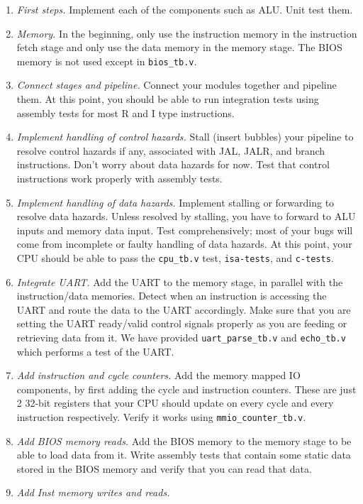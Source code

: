 \begin{enumerate}
\item \textit{First steps.}
  Implement each of the components such as ALU.
  Unit test them.
\item \textit{Memory.}
  In the beginning, only use the instruction memory in the instruction fetch stage and only use the data memory in the memory stage.
  The BIOS memory is not used except in \verb|bios_tb.v|.
\item \textit{Connect stages and pipeline.}
  Connect your modules together and pipeline them.
  At this point, you should be able to run integration tests using assembly tests for most R and I type instructions.
\item \textit{Implement handling of control hazards.}
  Stall (insert bubbles) your pipeline to resolve control hazards if any, associated with JAL, JALR, and branch instructions.
  Don't worry about data hazards for now.
  Test that control instructions work properly with assembly tests.
\item \textit{Implement handling of data hazards.}
  Implement stalling or forwarding to resolve data hazards.
  Unless resolved by stalling, you have to forward to ALU inputs and memory data input.
  Test comprehensively; most of your bugs will come from incomplete or faulty handling of data hazards.
  At this point, your CPU should be able to pass the \verb|cpu_tb.v| test, \verb|isa-tests|, and \verb|c-tests|.
\item \textit{Integrate UART.}
  Add the UART to the memory stage, in parallel with the  instruction/data memories.
  Detect when an instruction is accessing the UART and route the data to the UART accordingly.
  Make sure that you are setting the UART ready/valid control signals properly
  as you are feeding or retrieving data from it.
  We have provided \verb|uart_parse_tb.v| and \verb|echo_tb.v| which performs a test of the UART.
\item \textit{Add instruction and cycle counters.}
  Add the memory mapped IO components, by first adding the cycle and instruction counters.
  These are just 2 32-bit registers that your CPU should update on every cycle and every instruction respectively.
  Verify it works using \verb|mmio_counter_tb.v|.
\item \textit{Add BIOS memory reads.}
  Add the BIOS memory to the memory stage to be able to load data from it.
  Write assembly tests that contain some static data stored in the BIOS memory
  and verify that you can read that data.
\item \textit{Add Inst memory writes and reads.}

\end{enumerate}
